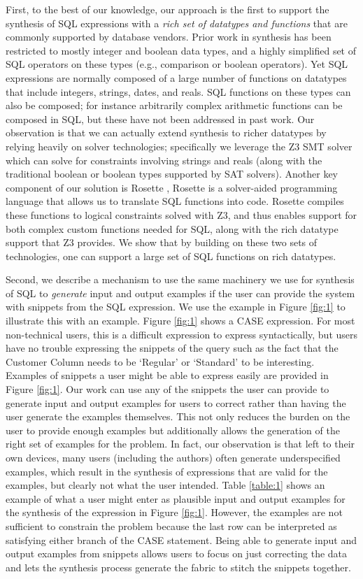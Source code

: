 First, to the best of our knowledge, our approach is the first to support the synthesis of SQL expressions with a \emph{rich set of datatypes and functions} that are commonly supported by database vendors.  Prior work in synthesis has been restricted to mostly integer and boolean data types, and a highly simplified set of SQL operators on these types (e.g., comparison or boolean operators).  Yet SQL expressions are normally composed of a large number of functions on datatypes that include integers, strings, dates, and reals.  SQL functions on these types can also be composed; for instance arbitrarily complex arithmetic functions can be composed in SQL, but these have not been addressed in past work.  Our observation is that we can actually extend synthesis to richer datatypes by relying heavily on solver technologies; specifically we leverage the Z3 SMT solver \cite{Z3} which can solve for constraints involving strings and reals (along with the traditional boolean or boolean types supported by SAT solvers).  Another key component of our solution is Rosette \cite{Rosette}, Rosette is a solver-aided programming language that allows us to translate SQL functions into code.  Rosette compiles these functions to logical constraints solved with Z3, and thus enables support for both complex custom functions needed for SQL, along with the rich datatype support that Z3 provides. We show that by building on these two sets of technologies, one can support a large set of SQL functions on rich datatypes. 

Second, we describe a mechanism to use the same machinery we use for synthesis of SQL to \emph{generate} input and output examples if the user can provide the system with snippets from the SQL expression.  We use the example in Figure \ref{fig:1} to illustrate this with an example.  Figure \ref{fig:1} shows a CASE expression.  For most non-technical users, this is a difficult expression to express syntactically, but users have no trouble expressing the snippets of the query such as the fact that the Customer Column needs to be `Regular' or  `Standard' to be interesting.  Examples of snippets a user might be able to express easily are provided in Figure \ref{fig:1}.  Our work can use any of the snippets the user can provide to generate input and output examples for users to correct rather than having the user generate the examples themselves.  This not only reduces the burden on the user to provide enough examples but additionally allows the generation of the right set of examples for the problem.  In fact, our observation is that left to their own devices, many users (including the authors) often generate underspecified examples, which result in the synthesis of expressions that are valid for the examples, but clearly not what the user intended.  Table \ref{table:1} shows an example of what a user might enter as plausible input and output examples for the synthesis of the expression in Figure \ref{fig:1}.  However, the examples are not sufficient to constrain the problem because the last row can be interpreted as satisfying either branch of the CASE statement.  Being able to generate input and output examples from snippets allows users to focus on just correcting the data and lets the synthesis process generate the fabric to stitch the snippets together. 

